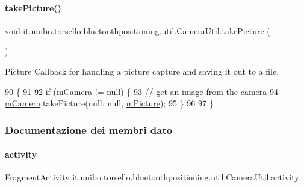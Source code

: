 \paragraph{\texorpdfstring{take\+Picture()}{takePicture()}}
{\footnotesize\ttfamily void it.\+unibo.\+torsello.\+bluetoothpositioning.\+util.\+Camera\+Util.\+take\+Picture (\begin{DoxyParamCaption}{ }\end{DoxyParamCaption})}

Picture Callback for handling a picture capture and saving it out to a file. 
\begin{DoxyCode}
90                               \{
91 
92         \textcolor{keywordflow}{if} (\hyperlink{classit_1_1unibo_1_1torsello_1_1bluetoothpositioning_1_1util_1_1CameraUtil_ac3d03bd30262a62e27b80e7bab97b40b_ac3d03bd30262a62e27b80e7bab97b40b}{mCamera} != null) \{
93             \textcolor{comment}{// get an image from the camera}
94             \hyperlink{classit_1_1unibo_1_1torsello_1_1bluetoothpositioning_1_1util_1_1CameraUtil_ac3d03bd30262a62e27b80e7bab97b40b_ac3d03bd30262a62e27b80e7bab97b40b}{mCamera}.takePicture(null, null, \hyperlink{classit_1_1unibo_1_1torsello_1_1bluetoothpositioning_1_1util_1_1CameraUtil_a1f456d8724b3f804be64512d8fcaef37_a1f456d8724b3f804be64512d8fcaef37}{mPicture});
95         \}
96 
97     \}
\end{DoxyCode}


\subsubsection{Documentazione dei membri dato}
\hypertarget{classit_1_1unibo_1_1torsello_1_1bluetoothpositioning_1_1util_1_1CameraUtil_a06e6b6842aa57e9e9db83a88b4aa3f25_a06e6b6842aa57e9e9db83a88b4aa3f25}{}\label{classit_1_1unibo_1_1torsello_1_1bluetoothpositioning_1_1util_1_1CameraUtil_a06e6b6842aa57e9e9db83a88b4aa3f25_a06e6b6842aa57e9e9db83a88b4aa3f25} 
\paragraph{\texorpdfstring{activity}{activity}}
{\footnotesize\ttfamily Fragment\+Activity it.\+unibo.\+torsello.\+bluetoothpositioning.\+util.\+Camera\+Util.\+activity\hspace{0.3cm}{\ttfamily [private]}}

